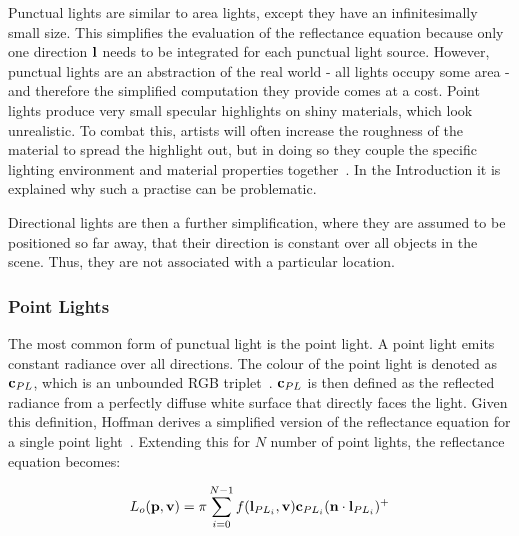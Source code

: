 Punctual lights are similar to area lights, except they have an infinitesimally small size. This simplifies the evaluation of the reflectance equation because only one direction \begin{math}\mathbf{l}\end{math} needs to be integrated for each punctual light source. However, punctual lights are an abstraction of the real world - all lights occupy some area - and therefore the simplified computation they provide comes at a cost. Point lights produce very small specular highlights on shiny materials, which look unrealistic. To combat this, artists will often increase the roughness of the material to spread the highlight out, but in doing so they couple the specific lighting environment and material properties together~\cite{MovingFrostbitetoPBR, RealShadingInUnreal}. In the Introduction it is explained why such a practise can be problematic.

Directional lights are then a further simplification, where they are assumed to be positioned so far away, that their direction is constant over all objects in the scene. Thus, they are not associated with a particular location.

\subsubsection{Point Lights}

The most common form of punctual light is the point light. A point light emits constant radiance over all directions. The colour of the point light is denoted as \begin{math}\mathbf{c}_{PL}\end{math}, which is an unbounded RGB triplet~\cite{HoffmanPBSBackground}. \begin{math}\mathbf{c}_{PL}\end{math} is then defined as the reflected radiance from a perfectly diffuse white surface that directly faces the light. Given this definition, Hoffman derives a simplified version of the reflectance equation for a single point light~\cite{HoffmanPBSBackground}. Extending this for \begin{math}N\end{math} number of point lights, the reflectance equation becomes:

\vspace{-0.5cm}

\begin{equation} \label{eq:PointLightsReflectanceEquation}
	L_o(\mathbf{p}, \mathbf{v}) = \pi\sum_{i = 0}^{N - 1}f(\mathbf{l}_{PL_i}, \mathbf{v})\mathbf{c}_{PL_i}(\mathbf{n}\cdot\mathbf{l}_{PL_i})^+
\end{equation}

